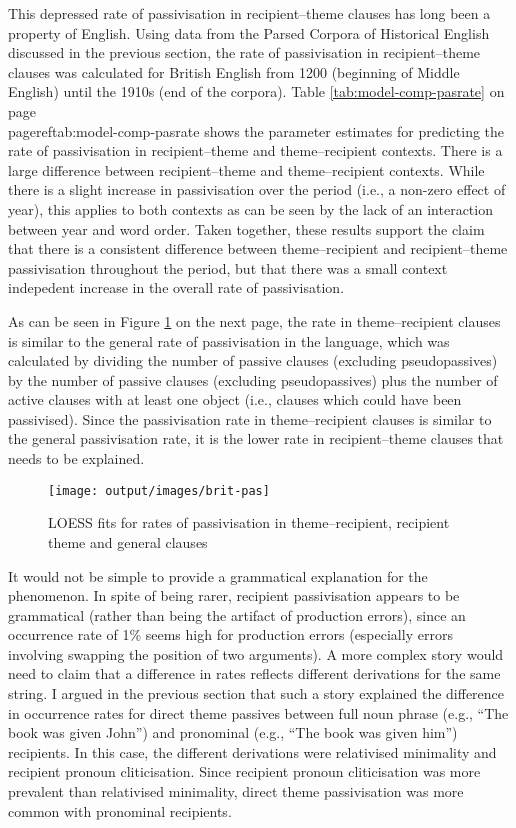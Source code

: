 	This depressed rate of passivisation in recipient--theme clauses has long been a property of English. Using data from the Parsed Corpora of Historical English discussed in the previous section, the rate of passivisation in recipient--theme clauses was calculated for British English from 1200 (beginning of Middle English) until the 1910s (end of the corpora). Table \ref{tab:model-comp-pasrate} on page \\pageref{tab:model-comp-pasrate} shows the parameter estimates for predicting the rate of passivisation in recipient--theme and theme--recipient contexts. There is a large difference between recipient--theme and theme--recipient contexts. While there is a slight increase in passivisation over the period (i.e., a non-zero effect of year), this applies to both contexts as can be seen by the lack of an interaction between year and word order. Taken together, these results support the claim that there is a consistent difference between theme--recipient and recipient--theme passivisation throughout the period, but that there was a small context indepedent  increase in the overall rate of passivisation.

	

	 As can be seen in Figure \ref{fig:brit-pas} on the next page, the rate in theme--recipient clauses is similar to the general rate of passivisation in the language, which was calculated by dividing the number of passive clauses (excluding pseudopassives) by the number of passive clauses (excluding pseudopassives) plus the number of active clauses with at least one object (i.e., clauses which could have been passivised). Since the passivisation rate in theme--recipient clauses is similar to the general passivisation rate, it is the lower rate in recipient--theme clauses that needs to be explained.

	\begin{figure}[ht!]
		\texttt{[image: output/images/brit-pas]}
		\caption{LOESS fits for rates of passivisation in theme--recipient, recipient theme and general clauses}
		\label{fig:brit-pas}
	\end{figure}

	It would not be simple to provide a grammatical explanation for the phenomenon. In spite of being rarer, recipient passivisation appears to be grammatical (rather than being the artifact of production errors), since an occurrence rate of 1\% seems high for production errors (especially errors involving swapping the position of two arguments). A more complex story would need to claim that a difference in rates reflects different derivations for the same string. I argued in the previous section that such a story explained the difference in occurrence rates for direct theme passives between full noun phrase (e.g., ``The book was given John'') and pronominal (e.g., ``The book was given him'') recipients. In this case, the different derivations were relativised minimality and recipient pronoun cliticisation. Since recipient pronoun cliticisation was more prevalent than relativised minimality, direct theme passivisation was more common with pronominal recipients.
	
